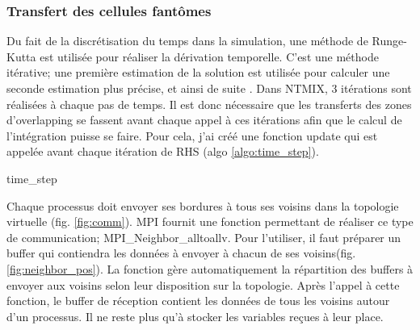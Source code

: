 \subsubsection{Transfert des cellules fantômes}




Du fait de la discrétisation du temps dans la simulation, une méthode de Runge-Kutta est utilisée pour réaliser la dérivation temporelle. C'est une méthode itérative; une première estimation de la solution est utilisée pour calculer une seconde estimation plus précise, et ainsi de suite \cite{Hirsch:1988:NCI:63653}. Dans NTMIX, 3 itérations sont réalisées à chaque pas de temps.
Il est donc nécessaire que les transferts des zones d'overlapping se fassent avant chaque appel à ces itérations afin que le calcul de l'intégration puisse se faire. Pour cela, j'ai créé une fonction update qui est appelée avant chaque itération de RHS (algo \ref{algo:time_step}).

\begin{algorithm}
  \caption{time\_step}
  \label{algo:time_step}
  \begin{algorithmic}
  \end{algorithmic}
\end{algorithm}



Chaque processus doit envoyer ses bordures à tous ses voisins dans la topologie virtuelle (fig. \ref{fig:comm}). MPI fournit une fonction permettant de réaliser ce type de communication; MPI\_Neighbor\_alltoallv. Pour l'utiliser, il faut préparer un buffer qui contiendra les données à envoyer à chacun de ses voisins(fig. \ref{fig:neighbor_pos}). La fonction gère automatiquement la répartition des buffers à envoyer aux voisins selon leur disposition sur la topologie. Après l'appel à cette fonction, le buffer de réception contient les données de tous les voisins autour d'un processus. Il ne reste plus qu'à stocker les variables reçues à leur place. 

